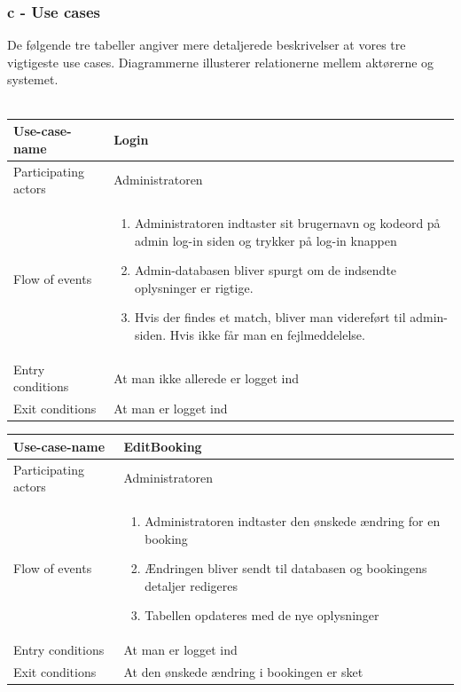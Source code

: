\documentclass[12pt,a4paper]{article}
\begin{document}
\subsubsection{c - Use cases}
De følgende tre tabeller angiver mere detaljerede beskrivelser at vores tre vigtigeste use cases. Diagrammerne illusterer relationerne mellem aktørerne og systemet. \\\\
\begin{minipage}{\textwidth}

 \label{tab:title}
\begin{tabular}{| p{5cm} p{10cm} |}
\hline Use-case-name & Login \\
\hline Participating actors & Administratoren \\
\hline Flow of events & \begin{enumerate}
\item Administratoren indtaster sit brugernavn og kodeord på admin log-in siden og trykker på log-in knappen
\item Admin-databasen bliver spurgt om de indsendte oplysninger er rigtige.
\item Hvis der findes et match, bliver man videreført til admin-siden. Hvis ikke får man en fejlmeddelelse.
\end{enumerate} \\
\hline Entry conditions & At man ikke allerede er logget ind \\
\hline Exit conditions & At man er logget ind \\
\hline
\end{tabular}

\end{minipage}

\bigskip

\begin{minipage}{\textwidth}

 \label{tab:title}
\begin{tabular}{| p{5cm} p{10cm} |}
\hline Use-case-name & EditBooking \\
\hline Participating actors & Administratoren \\
\hline Flow of events & \begin{enumerate}
\item Administratoren indtaster den ønskede ændring for en booking
\item Ændringen bliver sendt til databasen og bookingens detaljer redigeres
\item Tabellen opdateres med de nye oplysninger
\end{enumerate} \\
\hline Entry conditions & At man er logget ind \\
\hline Exit conditions & At den ønskede ændring i bookingen er sket \\
\hline
\end{tabular}

\end{minipage}
	
\end{document}
